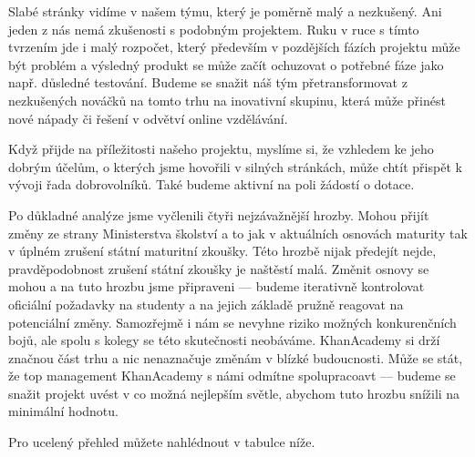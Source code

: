 \documentclass[12pt, a4paper]{report}
\begin{document}
Slabé stránky vidíme v našem týmu, který je poměrně malý a nezkušený. Ani jeden z nás nemá zkušenosti s podobným projektem. Ruku v ruce s tímto tvrzením jde i malý rozpočet, který především v pozdějších fázích projektu může být problém a výsledný produkt se může začít ochuzovat o potřebné fáze jako např. důsledné testování. Budeme se snažit náš tým přetransformovat z nezkušených nováčků na tomto trhu na inovativní skupinu, která může přinést nové nápady či řešení v odvětví online vzdělávání.

Když přijde na příležitosti našeho projektu, myslíme si, že vzhledem ke jeho dobrým účelům, o kterých jsme hovořili v silných stránkách, může chtít přispět k vývoji řada dobrovolníků. Také budeme aktivní na poli žádostí o dotace. 

Po důkladné analýze jsme vyčlenili čtyři nejzávažnější hrozby. Mohou přijít změny ze strany Ministerstva školství a to jak v aktuálních osnovách maturity tak v úplném zrušení státní maturitní zkoušky. Této hrozbě nijak předejít nejde, pravděpodobnost zrušení státní zkoušky je naštěstí malá. Změnit osnovy se mohou a na tuto hrozbu jsme připraveni --- budeme iterativně kontrolovat oficiální požadavky na studenty a na jejich základě pružně reagovat na potenciální změny. Samozřejmě i nám se nevyhne riziko možných konkurenčních bojů, ale spolu s kolegy se této skutečnosti neobáváme. KhanAcademy si drží značnou část trhu a nic nenaznačuje změnám v blízké budoucnosti. Může se stát, že top management KhanAcademy s námi odmítne spolupracoavt --- budeme se snažit projekt uvést v co možná nejlepším světle, abychom tuto hrozbu snížili na minimální hodnotu.

Pro ucelený přehled můžete nahlédnout v tabulce níže.
\end{document}
